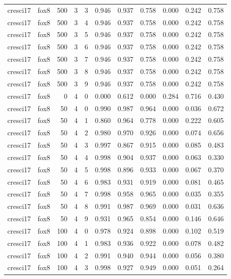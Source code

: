 \begin{tabular}{llrrrrrrrrr}
cresci17 & fox8 & 500 & 3 & 3 & 0.946 & 0.937 & 0.758 & 0.000 & 0.242 & 0.758 \\
cresci17 & fox8 & 500 & 3 & 4 & 0.946 & 0.937 & 0.758 & 0.000 & 0.242 & 0.758 \\
cresci17 & fox8 & 500 & 3 & 5 & 0.946 & 0.937 & 0.758 & 0.000 & 0.242 & 0.758 \\
cresci17 & fox8 & 500 & 3 & 6 & 0.946 & 0.937 & 0.758 & 0.000 & 0.242 & 0.758 \\
cresci17 & fox8 & 500 & 3 & 7 & 0.946 & 0.937 & 0.758 & 0.000 & 0.242 & 0.758 \\
cresci17 & fox8 & 500 & 3 & 8 & 0.946 & 0.937 & 0.758 & 0.000 & 0.242 & 0.758 \\
cresci17 & fox8 & 500 & 3 & 9 & 0.946 & 0.937 & 0.758 & 0.000 & 0.242 & 0.758 \\
cresci17 & fox8 & 0 & 4 & 0 & 0.000 & 0.612 & 0.000 & 0.284 & 0.716 & 0.430 \\
cresci17 & fox8 & 50 & 4 & 0 & 0.990 & 0.987 & 0.964 & 0.000 & 0.036 & 0.672 \\
cresci17 & fox8 & 50 & 4 & 1 & 0.860 & 0.964 & 0.778 & 0.000 & 0.222 & 0.605 \\
cresci17 & fox8 & 50 & 4 & 2 & 0.980 & 0.970 & 0.926 & 0.000 & 0.074 & 0.656 \\
cresci17 & fox8 & 50 & 4 & 3 & 0.997 & 0.867 & 0.915 & 0.000 & 0.085 & 0.483 \\
cresci17 & fox8 & 50 & 4 & 4 & 0.998 & 0.904 & 0.937 & 0.000 & 0.063 & 0.330 \\
cresci17 & fox8 & 50 & 4 & 5 & 0.998 & 0.896 & 0.933 & 0.000 & 0.067 & 0.370 \\
cresci17 & fox8 & 50 & 4 & 6 & 0.983 & 0.931 & 0.919 & 0.000 & 0.081 & 0.465 \\
cresci17 & fox8 & 50 & 4 & 7 & 0.998 & 0.958 & 0.965 & 0.000 & 0.035 & 0.355 \\
cresci17 & fox8 & 50 & 4 & 8 & 0.991 & 0.987 & 0.969 & 0.000 & 0.031 & 0.636 \\
cresci17 & fox8 & 50 & 4 & 9 & 0.931 & 0.965 & 0.854 & 0.000 & 0.146 & 0.646 \\
cresci17 & fox8 & 100 & 4 & 0 & 0.978 & 0.924 & 0.898 & 0.000 & 0.102 & 0.519 \\
cresci17 & fox8 & 100 & 4 & 1 & 0.983 & 0.936 & 0.922 & 0.000 & 0.078 & 0.482 \\
cresci17 & fox8 & 100 & 4 & 2 & 0.991 & 0.940 & 0.944 & 0.000 & 0.056 & 0.380 \\
cresci17 & fox8 & 100 & 4 & 3 & 0.998 & 0.927 & 0.949 & 0.000 & 0.051 & 0.264 \\

\end{tabular}

